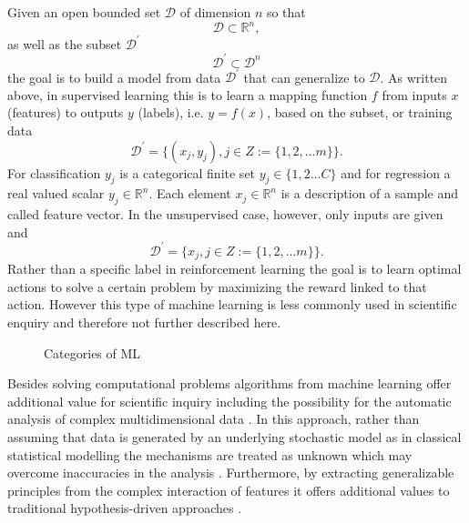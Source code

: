 Given an open bounded set \(\mathcal{D}\) of dimension \(n\) so that
\begin{equation}
    \mathcal{D}\subset\mathbb{R}^{n},
\end{equation}
as well as the subset \(\mathcal{D}^{'}\) 
\begin{equation}
    \mathcal{D}^{'}\subset\mathcal{D}^{n}
\end{equation}
the goal is to build a model from data \(\mathcal{D}^{'}\) that can generalize to \(\mathcal{D}\). As written above, in supervised learning this is to learn a mapping function \(f\) from inputs \(x\) (features) to outputs \(y\) (labels), i.e. \(y = f(x)\), based on the subset, or training data
\begin{equation}
    \mathcal{D}^{'}=\{(x_j, y_j), j \in Z := \{1,2,...m\}\}. 
\end{equation}
For classification \(y_j\) is a categorical finite set \(y_j \in \{1,2...C\}\) and for regression a real valued scalar \(y_j \in \mathbb R^{n}\). Each element \(x_j \in \mathbb R^{n}\) is a description of a sample and called feature vector.
In the unsupervised case, however, only inputs are given and 
\begin{equation}
    \mathcal{D}^{'}=\{x_j, j \in Z := \{1,2,...m\}\}. 
\end{equation}
Rather than a specific label in reinforcement learning the goal is to learn optimal actions to solve a certain problem by maximizing the reward linked to that action. However this type of machine learning is less commonly used in scientific enquiry and therefore not further described here.\\
\begin{figure*}[h]
  \caption{Categories of ML}
  \label{fig1:ml_types}
\end{figure*}
Besides solving computational problems algorithms from machine learning offer additional value for scientific inquiry including the possibility for the automatic analysis of complex multidimensional data \cite{Brunton2019,Breiman2001}. In this approach, rather than assuming that data is generated by an underlying stochastic model as in classical statistical modelling the mechanisms are treated as unknown which may overcome inaccuracies in the analysis \cite{Breiman2001}. Furthermore, by extracting generalizable principles from the complex interaction of features it offers additional values to traditional hypothesis-driven approaches \cite{Vu1601,Bzdok2017}.\\

